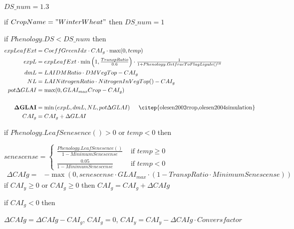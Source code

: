 \documentclass[%
]{scrartcl}
\begin{document}
   \quad\quad   $	DS\_num = 1.3 $
      	
     \quad\quad 	if $CropName = "WinterWheat"$ then 	$DS\_num =1 $
         
    \quad\quad  if $Phenology.DS<DS\_num$ then       
				\begin{align*}
         expLeafExt & =  CoeffGreenIdx  \cdot  CAI_g  \cdot  \max(0,temp)\\
         expL &  =  expLeafExt  \cdot  \min\left(1,\tfrac{TranspRatio}{0.6}\right)  \cdot   \tfrac{1}{1+Phenology.GetfracToFlagLigule()^{10}}  \\ 
         dmL  &  =  LAIDMRatio  \cdot  DMVegTop - CAI_g \\
         NL   &  =    LAINitrogenRatio  \cdot  NitrogenInVegTop()  - CAI_g \\
         pot\Delta GLAI  & =  \max(0,GLAI_{max}Crop-CAI_g) \\
         & \\         
         \mathbf{\Delta GLAI} & =  \min\left(expL, dmL, NL, pot\Delta GLAI\right) \quad 
\text{ \citep{olesen2002crop,olesen2004simulation}}\\
         CAI_g & =  CAI_g + \Delta GLAI 
        \end{align*}
      
 if $Phenology.LeafSenesence() > 0$ or  $temp < 0$ then
    
   $senescense = \begin{cases} \tfrac{Phenology.LeafSenesence()}{1-MinimumSenescense} & \text{ if } temp \ge 0 \\ 
  \tfrac{0.05}{1-MinimumSenescense} & \text{ if } temp < 0 
 \end{cases} $
  \begin{align*}
   \Delta CAIg  = & -\max(0,senescense  \cdot  GLAI_{max}   \cdot  (1-TranspRatio  \cdot  MinimumSenescense))
  \end{align*}
            if $CAI_y \ge 0 $ or  $CAI_g \ge 0 $ then $ CAI_g = CAI_g + \Delta CAIg $         
                       	
           if $CAI_g < 0$ then 

              \quad $\Delta CAIg = \Delta CAIg - CAI_g $,            
               $CAI_g = 0$, $CAI_y = CAI_y- \Delta CAIg  \cdot  Conversfactor$
             
\end{document}
